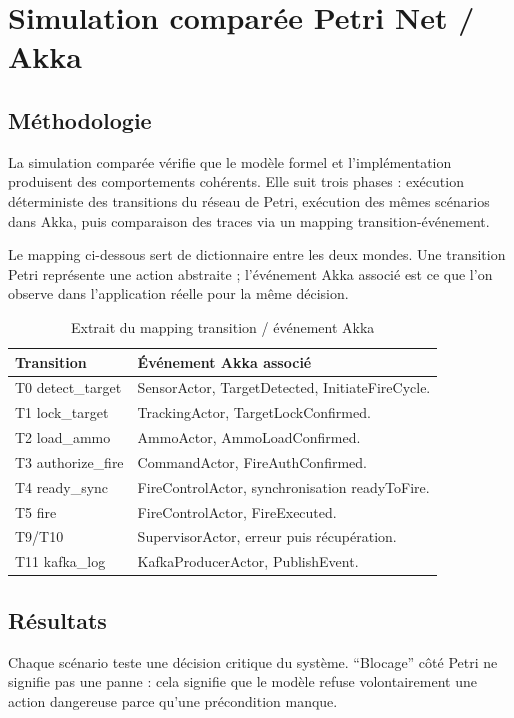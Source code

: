 \documentclass[11pt,a4paper]{report}
\begin{document}
\chapter{Simulation comparée Petri Net / Akka}

\section{Méthodologie}
La simulation comparée vérifie que le modèle formel et l'implémentation produisent des comportements cohérents. Elle suit trois phases : exécution déterministe des transitions du réseau de Petri, exécution des mêmes scénarios dans Akka, puis comparaison des traces via un mapping transition-événement.

Le mapping ci-dessous sert de dictionnaire entre les deux mondes. Une transition Petri représente une action abstraite ; l'événement Akka associé est ce que l'on observe dans l'application réelle pour la même décision.

\begin{table}[H]
\centering
\caption{Extrait du mapping transition / événement Akka}
\begin{tabularx}{\textwidth}{lY}
\toprule
Transition & Événement Akka associé \\
\midrule
T0 detect\_target & SensorActor, TargetDetected, InitiateFireCycle. \\
T1 lock\_target & TrackingActor, TargetLockConfirmed. \\
T2 load\_ammo & AmmoActor, AmmoLoadConfirmed. \\
T3 authorize\_fire & CommandActor, FireAuthConfirmed. \\
T4 ready\_sync & FireControlActor, synchronisation readyToFire. \\
T5 fire & FireControlActor, FireExecuted. \\
T9/T10 & SupervisorActor, erreur puis récupération. \\
T11 kafka\_log & KafkaProducerActor, PublishEvent. \\
\bottomrule
\end{tabularx}
\end{table}

\section{Résultats}
Chaque scénario teste une décision critique du système. ``Blocage'' côté Petri ne signifie pas une panne : cela signifie que le modèle refuse volontairement une action dangereuse parce qu'une précondition manque.
\end{document}
